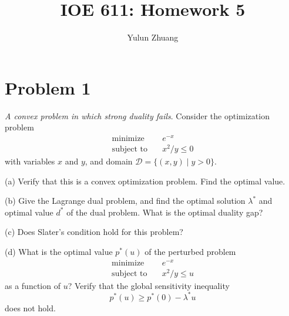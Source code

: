 \documentclass[11pt]{article}
\begin{document}
\title{IOE 611: Homework 5}
\author{Yulun Zhuang}
\maketitle
\section*{Problem 1}
\textit{A convex problem in which strong duality fails}. Consider the optimization problem
\begin{align*}
  \text{minimize} \quad & e^{-x}\\
  \text{subject to} \quad & x^2/y \leq 0
\end{align*}
with variables $x$ and $y$, and domain $\mathcal{D} = \{(x, y)\mid y>0\}$.

(a) Verify that this is a convex optimization problem. Find the optimal value.

(b) Give the Lagrange dual problem, and find the optimal solution $\lambda^*$ and optimal value $d^*$ of the dual problem. What is the optimal duality gap?

(c) Does Slater's condition hold for this problem?

(d) What is the optimal value $p^*(u)$ of the perturbed problem
\begin{align*}
  \text{minimize} \quad & e^{-x}\\
  \text{subject to} \quad & x^2/y \leq u
\end{align*}
as a function of $u$? Verify that the global sensitivity inequality
\[
  p^*(u) \geq p^*(0) - \lambda^* u
\]
does not hold.
\end{document}
